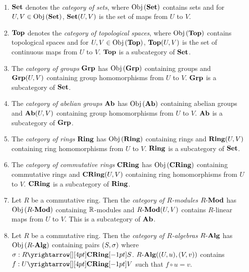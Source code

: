 \begin{eg}~
  \begin{enumerate}
    \item $\mathbf{Set}$ denotes the \emph{category of sets}, where 
    $\mathrm{Obj}\left(\mathbf{Set}\right)$ contains sets and for $U, V \in \mathrm{Obj}\left(\mathbf{Set}\right)$, 
    $\mathbf{Set}(U,V)$ is the set of maps from $U$ to $V$. 
    \item $\mathbf{Top}$ denotes the \emph{category of topological spaces}, where
    $\mathrm{Obj}\left(\mathbf{Top}\right)$ contains topological spaces and for $U, V \in \mathrm{Obj}\left(\mathbf{Top}\right)$, 
    $\mathbf{Top}(U,V)$ is the set of continuous maps from $U$ to $V$. 
    $\mathbf{Top}$ is a subcategory of $\mathbf{Set}$. 
    \item The \emph{category of groups} $\mathbf{Grp}$ has 
    $\mathrm{Obj}\left(\mathbf{Grp}\right)$ containing groups and 
    $\mathbf{Grp}(U,V)$ containing group homomorphisms from $U$ to $V$. 
    $\mathbf{Grp}$ is a subcategory of $\mathbf{Set}$.  
    \item The \emph{category of abelian groups} $\mathbf{Ab}$ has 
    $\mathrm{Obj}\left(\mathbf{Ab}\right)$ containing abelian groups and 
    $\mathbf{Ab}(U,V)$ containing group homomorphisms from $U$ to $V$. 
    $\mathbf{Ab}$ is a subcategory of $\mathbf{Grp}$. 
    \item The \emph{category of rings} $\mathbf{Ring}$ has 
    $\mathrm{Obj}\left(\mathbf{Ring}\right)$ containing rings and 
    $\mathbf{Ring}(U,V)$ containing ring homomorphisms from $U$ to $V$.
    $\mathbf{Ring}$ is a subcategory of $\mathbf{Set}$. 
    \item The \emph{category of commutative rings} $\mathbf{CRing}$ has 
    $\mathrm{Obj}\left(\mathbf{CRing}\right)$ containing commutative rings and 
    $\mathbf{CRing}(U,V)$ containing ring homomorphisms from $U$ to $V$.
    $\mathbf{CRing}$ is a subcategory of $\mathbf{Ring}$. 
    \item Let $R$ be a commutative ring. 
    Then the \emph{category of $R$-modules} $R\text{-}\mathbf{Mod}$ has 
    $\mathrm{Obj}\left(R\text{-}\mathbf{Mod}\right)$ containing $\mathbb{R}$-modules and 
    $R\text{-}\mathbf{Mod}(U,V)$ contains $R$-linear maps from $U$ to $V$.
    This is a subcategory of $\mathbf{Ab}$. 
    \item Let $R$ be a commutative ring. 
    Then the \emph{category of $R$-algebras} $R\text{-}\mathbf{Alg}$ has 
    $\mathrm{Obj}\left(R\text{-}\mathbf{Alg}\right)$ containing pairs $(S,\sigma)$ where $\si : \map{R}{S}{\CRING}{}$.
    $R\text{-}\mathbf{Alg}((U,u),(V,v))$ contains $f : \map{U}{V}{\CRING}{}$ such that 
    $f \circ u = v$. 
  \end{enumerate}
\end{eg}

